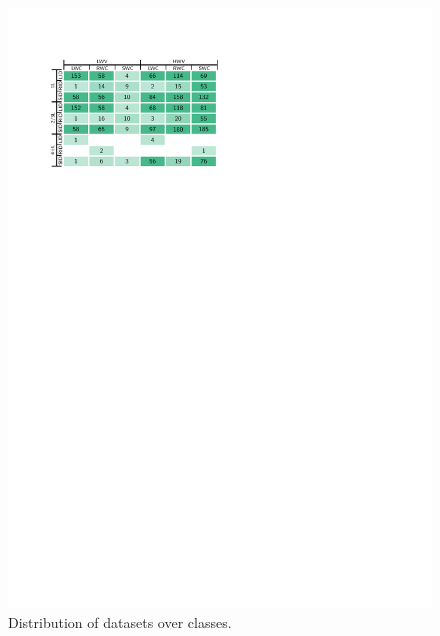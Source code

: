 \begin{figure}[t]
    \centering
    \includegraphics{figures/treemap-evaluation/count}
    \caption{Distribution of datasets over classes.}
    \label{fig:datasets_summary}
\end{figure}

